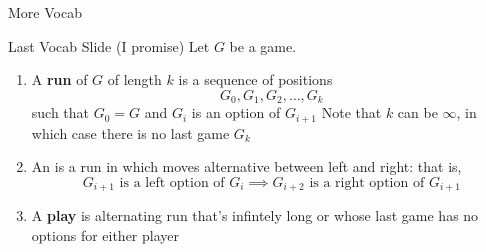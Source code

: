 \documentclass{beamer}
\begin{document}
\begin{frame}{More Vocab}
    


\end{frame}

\begin{frame}{Last Vocab Slide (I promise)}
    Let $G$ be a game.
    \begin{definition}
        \begin{enumerate}
            \item<2-> A \textbf{run} of $G$ of length $k$ is a sequence of positions
                $$G_0, G_1, G_2, \ldots, G_k$$
                such that $G_0 = G$ and $G_i$ is an option of $G_{i+1}$
                Note that $k$ can be $\infty$, in which case there is no last game $G_k$
            \item<3-> An  is a run in which moves alternative between left and right: that is,
                $$G_{i+1} \text{ is a left option of } G_i \implies G_{i+2} \text{ is a right option of } G_{i+1}$$
            \item<4-> A \textbf{play} is alternating run that's infintely long or whose last game has no options for either player
        \end{enumerate}
    \end{definition}
\end{frame}
\end{document}
